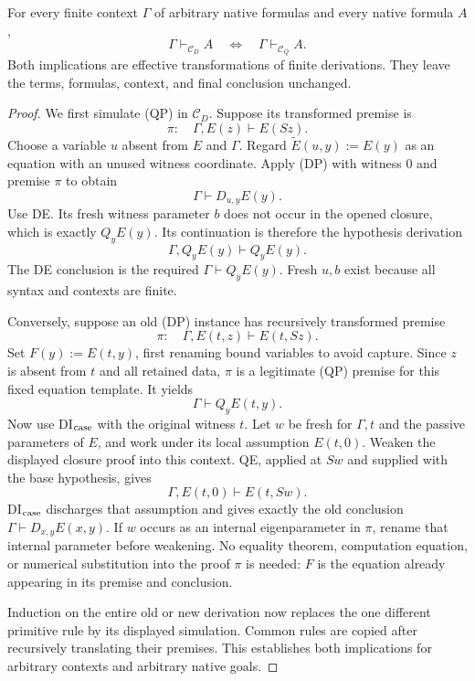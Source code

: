 \begin{theorem}
For every finite context $\Gamma$ of arbitrary native formulas and every
native formula $A$,
\[
       \Gamma\vdash_{\mathcal C_D} A
       \quad\Longleftrightarrow\quad
       \Gamma\vdash_{\mathcal C_Q} A.
\]
Both implications are effective transformations of finite derivations.
They leave the terms, formulas, context, and final conclusion unchanged.
\end{theorem}
\begin{proof}
We first simulate (QP) in $\mathcal C_D$.  Suppose its transformed premise
is
\[
                \pi:\quad\Gamma,E(z)\vdash E(Sz).
\]
Choose a variable $u$ absent from $E$ and $\Gamma$.  Regard
$\widetilde E(u,y):=E(y)$ as an equation with an unused witness coordinate.
Apply (DP) with witness $0$ and premise $\pi$ to obtain
\[
                    \Gamma\vdash D_{u,y}E(y).
\]
Use DE.  Its fresh witness parameter $b$ does not occur in the opened
closure, which is exactly $Q_yE(y)$.  Its continuation is therefore the
hypothesis derivation
\[
              \Gamma,Q_yE(y)\vdash Q_yE(y).
\]
The DE conclusion is the required $\Gamma\vdash Q_yE(y)$.
Fresh $u,b$ exist because all syntax and contexts are finite.

Conversely, suppose an old (DP) instance has recursively transformed
premise
\[
                \pi:\quad\Gamma,E(t,z)\vdash E(t,Sz).
\]
Set $F(y):=E(t,y)$, first renaming bound variables to avoid capture.
Since $z$ is absent from $t$ and all retained data, $\pi$ is a legitimate
(QP) premise for this fixed equation template.  It yields
\[
                         \Gamma\vdash Q_yE(t,y).
\]
Now use DI$_{\rm case}$ with the original witness $t$.  Let $w$ be fresh
for $\Gamma,t$ and the passive parameters of $E$, and work under its
local assumption $E(t,0)$.  Weaken the displayed closure proof into this
context.  QE, applied at $Sw$ and supplied with the base hypothesis,
gives
\[
              \Gamma,E(t,0)\vdash E(t,Sw).
\]
DI$_{\rm case}$ discharges that assumption and gives exactly the old
conclusion $\Gamma\vdash D_{x,y}E(x,y)$.  If $w$ occurs as an internal
eigenparameter in $\pi$, rename that internal parameter before weakening.
No equality theorem, computation equation, or numerical substitution into
the proof $\pi$ is needed: $F$ is the equation already appearing in its
premise and conclusion.

Induction on the entire old or new derivation now replaces the one
different primitive rule by its displayed simulation.  Common rules are
copied after recursively translating their premises.  This establishes
both implications for arbitrary contexts and arbitrary native goals.
\end{proof}


